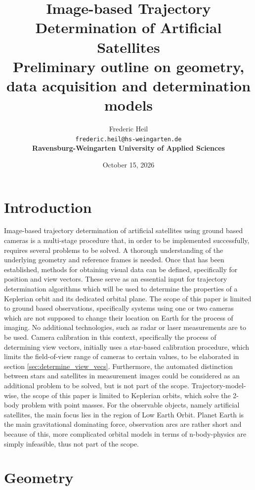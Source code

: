 \documentclass[11pt,a4paper]{article}
\title{Image-based Trajectory Determination of Artificial Satellites \\\large Preliminary outline on geometry, data acquisition and determination models}
\author{Frederic Heil\\
	\texttt{frederic.heil@hs-weingarten.de}\\
	\textbf{Ravensburg-Weingarten University of Applied Sciences}
}
\date{October 15, 2026}
\begin{document}
	\maketitle
	\section{Introduction}
	\label{sec:introduction}
	Image-based trajectory determination of artificial satellites using ground based cameras is a multi-stage procedure that, in order to be implemented successfully, requires several problems to be solved. A thorough understanding of the underlying geometry and reference frames is needed. Once that has been established, methods for obtaining visual data can be defined, specifically for position and view vectors. These serve as an essential input for trajectory determination algorithms which will be used to determine the properties of a Keplerian orbit and its dedicated orbital plane.\newline
	The scope of this paper is limited to ground based observations, specifically systems using one or two cameras which are not supposed to change their location on Earth for the process of imaging. No additional technologies, such as radar or laser measurements are to be used. Camera calibration in this context, specifically the process of determining view vectors, initially uses a star-based calibration procedure, which limits the field-of-view range of cameras to certain values, to be elaborated in section \ref{sec:determine_view_vecs}. Furthermore, the automated distinction between stars and satellites in measurement images could be considered as an additional problem to be solved, but is not part of the scope.\newline
	Trajectory-model-wise, the scope of this paper is limited to Keplerian orbits, which solve the 2-body problem with point masses. For the observable objects, namely artificial satellites, the main focus lies in the region of Low Earth Orbit. Planet Earth is the main gravitational dominating force, observation arcs are rather short and because of this, more complicated orbital models in terms of n-body-physics are simply infeasible, thus not part of the scope.


	\section{Geometry}
\end{document}
